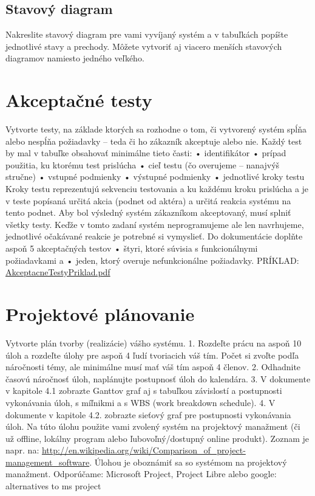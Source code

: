 \subsection{Stavový diagram}
Nakreslite stavový diagram pre vami vyvíjaný systém a v tabuľkách popíšte
jednotlivé stavy a prechody. Môžete vytvoriť aj viacero menších stavových diagramov namiesto
jedného veľkého.


\section{Akceptačné testy}
Vytvorte testy, na základe ktorých sa rozhodne o tom, či vytvorený systém spĺňa alebo nespĺňa
požiadavky – teda či ho zákazník akceptuje alebo nie. Každý test by mal v tabuľke obsahovať minimálne
tieto časti:
• identifikátor
• prípad použitia, ku ktorému test prislúcha
• cieľ testu (čo overujeme – nanajvýš stručne)
• vstupné podmienky
• výstupné podmienky
• jednotlivé kroky testu
Kroky testu reprezentujú sekvenciu testovania a ku každému kroku prislúcha a je v teste popísaná určitá
akcia (podnet od aktéra) a určitá reakcia systému na tento podnet. Aby bol výsledný systém zákazníkom
akceptovaný, musí splniť všetky testy. Keďže v tomto zadaní systém neprogramujeme ale len
navrhujeme, jednotlivé očakávané reakcie je potrebné si vymyslieť.
Do dokumentácie doplňte aspoň 5 akceptačných testov
• štyri, ktoré súvisia s funkcionálnymi požiadavkami a
• jeden, ktorý overuje nefunkcionálne požiadavky.
PRÍKLAD: \href{https://uim.fei.stuba.sk/wp-content/uploads/2022/10/AkceptacneTestyPriklad.pdf}{AkceptacneTestyPriklad.pdf}


\section{Projektové plánovanie}
Vytvorte plán tvorby (realizácie) vášho systému.
1. Rozdeľte prácu na aspoň 10 úloh a rozdeľte úlohy pre aspoň 4 ľudí tvoriacich váš tím. Počet si zvoľte
podľa náročnosti témy, ale minimálne musí mať váš tím aspoň 4 členov.
2. Odhadnite časovú náročnosť úloh, naplánujte postupnosť úloh do kalendára.
3. V dokumente v kapitole 4.1 zobrazte Ganttov graf aj s tabuľkou závislostí a postupnosti vykonávania
úloh, s míľnikmi a s WBS (work breakdown schedule).
4. V dokumente v kapitole 4.2. zobrazte sieťový graf pre postupnosti vykonávania úloh.
Na túto úlohu použite vami zvolený systém na projektový manažment (či už offline, lokálny program
alebo ľubovoľný/dostupný online produkt). Zoznam je napr. na:
\url{http://en.wikipedia.org/wiki/Comparison_of_project-management_software}. Úlohou je oboznámiť sa
so systémom na projektový manažment.
Odporúčame: Microsoft Project, Project Libre alebo google: alternatives to ms project

